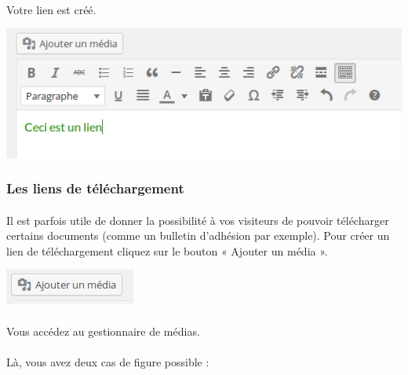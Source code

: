 \documentclass[10pt,a4paper]{article}
\begin{document}
\paragraph{}Votre lien est créé.
\begin{center}
\includegraphics[scale=0.35]{img/0079.png}
\end{center}
\subsubsection{Les liens de téléchargement}
\paragraph{}Il est parfois utile de donner la possibilité à vos visiteurs de pouvoir télécharger certains documents (comme un bulletin d'adhésion par exemple). Pour créer un lien de téléchargement cliquez sur le bouton « Ajouter un média ».
\begin{center}
\includegraphics[scale=0.35]{img/0081.png}
\end{center}
\paragraph{}Vous accédez au gestionnaire de médias.
\paragraph{}Là, vous avez deux cas de figure possible :
\end{document}
